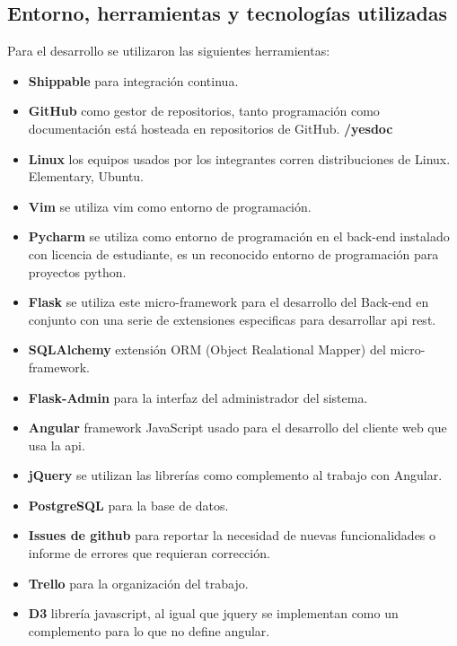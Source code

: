 




\subsection{Entorno, herramientas y tecnologías utilizadas}

Para el desarrollo se utilizaron las siguientes herramientas:

\begin{itemize}
\item \textbf{Shippable} para integración continua.
\item \textbf{GitHub}  como gestor de repositorios, tanto programación como documentación está hosteada en repositorios de GitHub. \textbf{/yesdoc}
\item \textbf{Linux} los equipos usados por los integrantes corren distribuciones de Linux. Elementary, Ubuntu.
\item \textbf {Vim} se utiliza vim como entorno de programación.
\item \textbf{Pycharm} se utiliza como entorno de programación en el back-end instalado con licencia de estudiante, es un reconocido entorno de programación para proyectos python.
\item \textbf{Flask} se utiliza este micro-framework para el desarrollo del Back-end en conjunto con una serie de extensiones especificas para desarrollar api rest.
\item \textbf{SQLAlchemy} extensión ORM (Object Realational Mapper) del micro-framework.
\item \textbf{Flask-Admin} para la interfaz del administrador del sistema.
\item \textbf{Angular} framework JavaScript usado para el desarrollo del cliente web que usa la api.
\item \textbf{jQuery} se utilizan las librerías como complemento al trabajo con Angular.
\item \textbf{PostgreSQL} para la base de datos.
\item \textbf{Issues de github} para reportar la necesidad de nuevas funcionalidades o informe de errores que requieran corrección.
\item \textbf{Trello} para la organización del trabajo.
\item \textbf{D3} librería javascript, al igual que jquery se implementan como un complemento para lo que no define angular.

\end{itemize}
